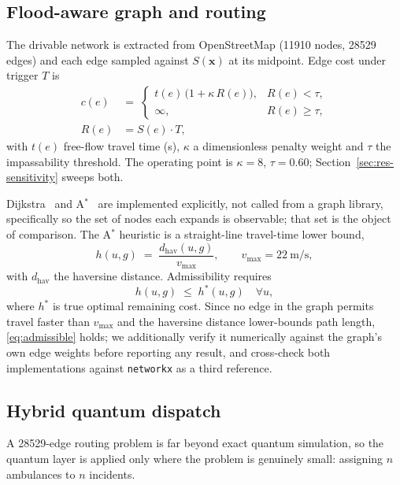 \documentclass[10pt,twocolumn]{article}
\newcommand{\Sx}{S(\mathbf{x})}
\begin{document}
\subsection{Flood-aware graph and routing}
\label{sec:method-routing}
The drivable network is extracted from OpenStreetMap (\num{11910} nodes,
\num{28529} edges) and each edge sampled against $\Sx$ at its midpoint. Edge cost
under trigger $T$ is
\begin{align}
c(e) \;&=\;
\begin{cases}
t(e)\,\bigl(1+\kappa\,R(e)\bigr), & R(e) < \tau,\\[2pt]
\infty, & R(e) \ge \tau,
\end{cases} \nonumber\\[2pt]
R(e) &= S(e)\cdot T,
\label{eq:edgecost}
\end{align}
with $t(e)$ free-flow travel time (\si{\second}), $\kappa$ a dimensionless
penalty weight and $\tau$ the impassability threshold. The operating point is
$\kappa=8$, $\tau=0.60$; Section~\ref{sec:res-sensitivity} sweeps both.

Dijkstra~\citep{dijkstra1959} and A$^\ast$~\citep{hart1968} are implemented
explicitly, not called from a graph library, specifically so the set of
nodes each expands is observable; that set is the object of comparison. The
A$^\ast$ heuristic is a straight-line travel-time lower bound,
\begin{equation}
h(u,g) \;=\; \frac{d_{\mathrm{hav}}(u,g)}{v_{\max}},
\qquad v_{\max}=\SI{22}{\metre\per\second},
\label{eq:heuristic}
\end{equation}
with $d_{\mathrm{hav}}$ the haversine distance. Admissibility requires
\begin{equation}
h(u,g) \;\le\; h^{*}(u,g) \quad \forall u,
\label{eq:admissible}
\end{equation}
where $h^{*}$ is true optimal remaining cost. Since no edge in the graph permits
travel faster than $v_{\max}$ and the haversine distance lower-bounds path
length, \eqref{eq:admissible} holds; we additionally verify it numerically
against the graph's own edge weights before reporting any result, and cross-check
both implementations against \texttt{networkx} as a third reference.

\subsection{Hybrid quantum dispatch}
\label{sec:method-qaoa}
A \num{28529}-edge routing problem is far beyond exact quantum simulation, so the
quantum layer is applied only where the problem is genuinely small: assigning
$n$ ambulances to $n$ incidents.
\end{document}
